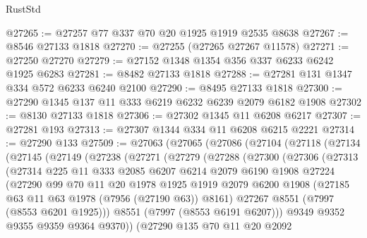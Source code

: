 \begin{lexlean}{RustStd}
\begin{coremodule}
{\begin{coremodule}
{{{{{{{{{{{{{{{{{{{{{{{{{{{{{{{{{{{{{{{{{{{@27265 := @27257 @77 @337 @70 @20 @1925 @1919 @2535 @8638
@27267 := @8546 @27133 @1818
@27270 := @27255 (@27265 @27267 @11578)
@27271 := @27250 @27270
@27279 := @27152 @1348 @1354 @356 @337 @6233 @6242 @1925 @6283
@27281 := @8482 @27133 @1818
@27288 := @27281 @131 @1347 @334 @572 @6233 @6240 @2100
@27290 := @8495 @27133 @1818
@27300 := @27290 @1345 @137 @11 @333 @6219 @6232 @6239 @2079 @6182 @1908
@27302 := @8130 @27133 @1818
@27306 := @27302 @1345 @11 @6208 @6217
@27307 := @27281 @193
@27313 := @27307 @1344 @334 @11 @6208 @6215 @2221
@27314 := @27290 @133
@27509 := @27063
    (@27065
      (@27086
        (@27104
          (@27118
            (@27134
              (@27145
                (@27149
                  (@27238
                    (@27271
                      (@27279
                        (@27288
                          (@27300
                            (@27306
                              (@27313
                                (@27314
                                  @225
                                  @11
                                  @333
                                  @2085
                                  @6207
                                  @6214
                                  @2079
                                  @6190
                                  @1908
                                  @27224
                                  (@27290
                                    @99
                                    @70
                                    @11
                                    @20
                                    @1978
                                    @1925
                                    @1919
                                    @2079
                                    @6200
                                    @1908
                                    (@27185 @63 @11 @63 @1978 (@7956 (@27190 @63)) @8161)
                                    @27267
                                    @8551
                                    (@7997 (@8553 @6201 @1925)))
                                  @8551
                                  (@7997 (@8553 @6191 @6207)))
                                @9349
                                @9352
                                @9355
                                @9359
                                @9364
                                @9370))
                            (@27290
                              @135
                              @70
                              @11
                              @20
                              @2092
}}}}}}}}}}}}}}}}}}}}}}}}}}}}}}}}}}}}}}}}}}}
\end{coremodule}}
\end{coremodule}
\end{lexlean}
